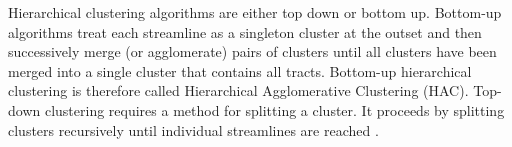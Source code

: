 
Hierarchical clustering algorithms are either top down or bottom up. Bottom-up algorithms treat each streamline as a singleton cluster at the outset and then successively merge (or agglomerate) pairs of clusters until all clusters have been merged into a single cluster that contains all tracts. Bottom-up hierarchical clustering is therefore called Hierarchical Agglomerative Clustering (HAC). Top-down clustering requires a method for splitting a cluster. It proceeds by splitting clusters recursively until individual streamlines are reached \cite{johnson1967hierarchical}.


